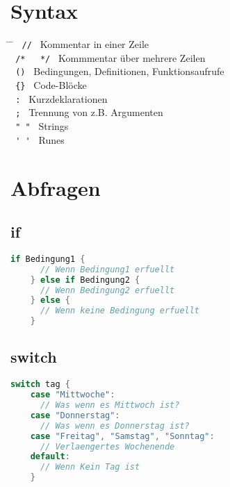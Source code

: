 \documentclass[twoside,a4paper,12pt]{article}
\begin{document}
\section{Syntax}
\begin{tabbing}
  \hspace{2mm} \= \hspace{30mm} \= \kill
  \> \verb| // | \> Kommentar in einer Zeile \\
  \> \verb| /*   */ | \> Kommmentar über mehrere Zeilen \\ 
  \> \verb| () | \> Bedingungen, Definitionen, Funktionsaufrufe \\ 
  \> \verb| {} | \> Code-Blöcke \\ 
  \> \verb| : | \> Kurzdeklarationen \\ 
  \> \verb| ; | \> Trennung von z.B. Argumenten \\ 
  \> \verb| " " | \> Strings \\ 
  \> \verb| ' ' | \> Runes \\ 
\end{tabbing}

\section{Abfragen}
\subsection{if}
\begin{center}
  \begin{minipage}{1.0\textwidth}
    \begin{lstlisting}[language=Go]
    if Bedingung1 {
      // Wenn Bedingung1 erfuellt
    } else if Bedingung2 {
      // Wenn Bedingung2 erfuellt
    } else {
      // Wenn keine Bedingung erfuellt
    }
    \end{lstlisting}
  \end{minipage}
\end{center}

\subsection{switch}
\begin{center}
  \begin{minipage}{1.0\textwidth}
    \begin{lstlisting}[language=Go]
    switch tag {
    case "Mittwoche":
      // Was wenn es Mittwoch ist? 
    case "Donnerstag":
      // Was wenn es Donnerstag ist?
    case "Freitag", "Samstag", "Sonntag":
      // Verlaengertes Wochenende 
    default:
      // Wenn Kein Tag ist
    }
    \end{lstlisting}
  \end{minipage}
\end{center}
\end{document}
